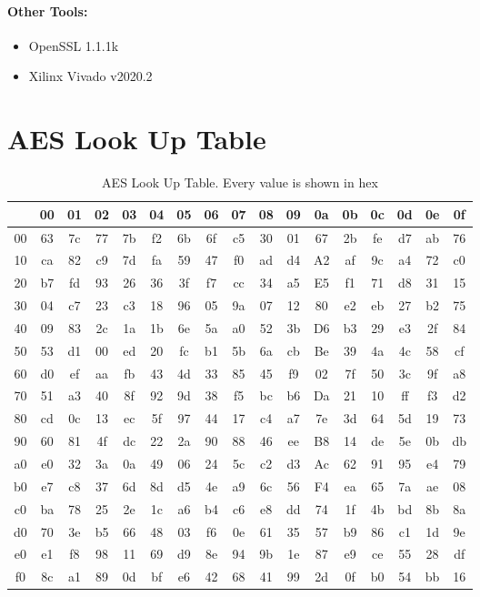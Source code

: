 \documentclass[a4paper, openany]{book}
\begin{document}
\begin{appendix}
\begin{minipage}{0.4\textwidth}
\subsubsection{Other Tools:}
\begin{itemize}
\itemsep0em
\item OpenSSL 1.1.1k\\
\item Xilinx Vivado v2020.2\\
\end{itemize}
\end{minipage}
\chapter{AES Look Up Table}
\label{AESLUT}
\begin{table}[!htb]
\centering
\captionsetup{width=.8\linewidth}
\begin{tabular}{c || c c c c c c c c c c c c c c c c}
\hline
   & 00 & 01 & 02 & 03 & 04 & 05 & 06 & 07 & 08 & 09 & 0a & 0b & 0c  & 0d & 0e & 0f\\
\hline
00 & 63 & 7c & 77 & 7b & f2 & 6b & 6f & c5 & 30 & 01 & 67 & 2b & fe  & d7 & ab & 76\\
10 & ca & 82 & c9 & 7d & fa & 59 & 47 & f0 & ad & d4 & A2 & af & 9c  & a4 & 72 & c0\\
20 & b7 & fd & 93 & 26 & 36 & 3f & f7 & cc & 34 & a5 & E5 & f1 & 71  & d8 & 31 & 15\\
30 & 04 & c7 & 23 & c3 & 18 & 96 & 05 & 9a & 07 & 12 & 80 & e2 & eb  & 27 & b2 & 75\\
40 & 09 & 83 & 2c & 1a & 1b & 6e & 5a & a0 & 52 & 3b & D6 & b3 & 29  & e3 & 2f & 84\\
50 & 53 & d1 & 00 & ed & 20 & fc & b1 & 5b & 6a & cb & Be & 39 & 4a  & 4c & 58 & cf\\
60 & d0 & ef & aa & fb & 43 & 4d & 33 & 85 & 45 & f9 & 02 & 7f & 50  & 3c & 9f & a8\\
70 & 51 & a3 & 40 & 8f & 92 & 9d & 38 & f5 & bc & b6 & Da & 21 & 10  & ff & f3 & d2\\
80 & cd & 0c & 13 & ec & 5f & 97 & 44 & 17 & c4 & a7 & 7e & 3d & 64  & 5d & 19 & 73\\
90 & 60 & 81 & 4f & dc & 22 & 2a & 90 & 88 & 46 & ee & B8 & 14 & de  & 5e & 0b & db\\
a0 & e0 & 32 & 3a & 0a & 49 & 06 & 24 & 5c & c2 & d3 & Ac & 62 & 91  & 95 & e4 & 79\\
b0 & e7 & c8 & 37 & 6d & 8d & d5 & 4e & a9 & 6c & 56 & F4 & ea & 65  & 7a & ae & 08\\
c0 & ba & 78 & 25 & 2e & 1c & a6 & b4 & c6 & e8 & dd & 74 & 1f & 4b  & bd & 8b & 8a\\
d0 & 70 & 3e & b5 & 66 & 48 & 03 & f6 & 0e & 61 & 35 & 57 & b9 & 86  & c1 & 1d & 9e\\
e0 & e1 & f8 & 98 & 11 & 69 & d9 & 8e & 94 & 9b & 1e & 87 & e9 & ce  & 55 & 28 & df\\
f0 & 8c & a1 & 89 & 0d & bf & e6 & 42 & 68 & 41 & 99 & 2d & 0f & b0  & 54 & bb & 16
\end{tabular}
\caption[AES Look Up Table]%
{AES Look Up Table. Every value is shown in hex}
\label{tab:AESTable}
\end{table}

\end{appendix}
\end{document}
